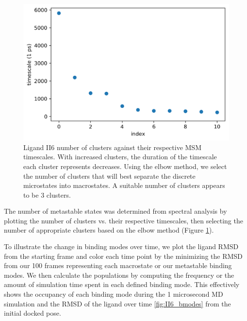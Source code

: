 \begin{figure}
    \centering
    \includegraphics{chapter5/II6/II6_1-full-spectra.png}
    \caption[Spectral Analysis of Ligand II6]{Ligand II6 number of clusters against their respective MSM timescales. With increased clusters, the duration of the timescale each cluster represents decreases. Using the elbow method, we select the number of clusters that will best separate the discrete microstates into macrostates. A suitable number of clusters appears to be 3 clusters. }
    \label{fig:II6_1-spectral}
\end{figure}

The number of metastable states was determined from spectral analysis by plotting the number of clusters vs. their respective timescales, then selecting the number of appropriate clusters based on the elbow method (Figure \ref{fig:II6_1-spectral}).

To illustrate the change in binding modes over time, we plot the ligand RMSD from the starting frame and color each time point by the minimizing the RMSD from our 100 frames representing each macrostate or our metastable binding modes.
We then calculate the populations by computing the frequency or the amount of simulation time spent in each defined binding mode.
This effectively shows the occupancy of each binding mode during the 1 microsecond MD simulation and the RMSD of the ligand over time \ref{fig:II6_bmodes} from the initial docked pose.


